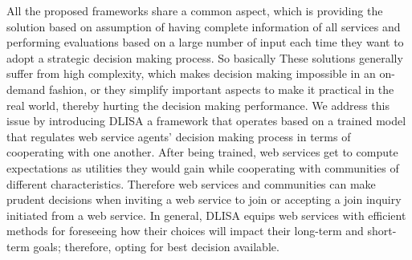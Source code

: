 \documentclass[10pt,journal,cspaper,compsoc]{IEEEtran}
\begin{document}
All the proposed frameworks share a common aspect, which is providing the solution based on assumption of having complete information of all services and performing evaluations based on a large number of input each time they want to adopt a strategic decision making process. 
So basically These solutions generally suffer from high complexity, which makes decision making impossible in an on-demand fashion, or they simplify important aspects to make it practical in the real world, thereby hurting the decision making performance. We address this issue by introducing DLISA a framework that operates based on a trained model that regulates web service agents' decision making process in terms of cooperating with one another. After being trained, web services get to compute expectations as utilities they would gain while cooperating with communities of different characteristics. Therefore web services and communities can make prudent decisions when inviting a web service to join or accepting a join inquiry initiated from a web service. In general, DLISA equips web services with efficient methods for foreseeing how their choices will impact their long-term and short-term goals; therefore, opting for best decision available. 




\end{document}
